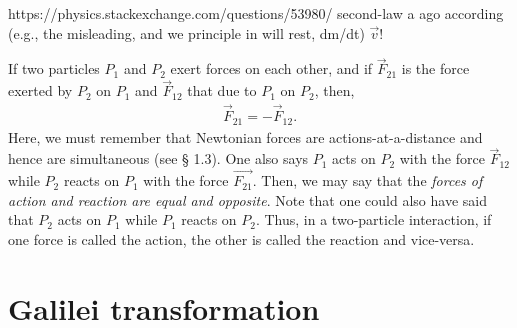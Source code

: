 https://physics.stackexchange.com/questions/53980/
second-law
% 
% 
a 
ago 
according 
(e.g., 
the 
misleading, 
% 
% 
and we 
principle 
in 
will 
rest, 
dm/dt)  
$\vec{v} !$

 If two particles $P_1$ and $P_2$ exert
forces on each other, and if $\vec{F}_{21}$ is the 
force
exerted by $P_2$ on $P_1$ and $\vec{F}_{12}$ that due 
to
$P_1$ on $P_2$, then,
\begin{align}\label{gr.5}
\vec{F}_{21} = -\vec{F}_{12}.
\end{align}
Here, we must remember that Newtonian forces are 
actions-at-a-distance and hence are simultaneous (see 
\S 
1.3). One also says $P_1$ {acts on} $P_2$ with the 
force 
$\vec{F}_{12} $ while $P_2$ {reacts on} $P_1$ with the 
force 
$\vec{ F_{21}}$. Then, we may say that the 
\textsl{forces of 
action and reaction are equal and opposite}. Note that 
one 
could also have said that $P_2$ {acts on} $P_1$ while 
$P_1$ 
{reacts on} $P_2$. Thus, in a two-particle interaction, 
if 
one force is called the action, the other is called 
the 
reaction and vice-versa.

\vspace{-.3cm}
\section{Galilei transformation}


